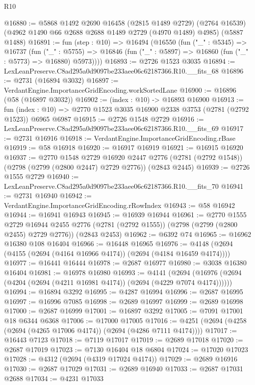 \begin{lexlean}{R10}
\begin{coremodule}
@16880 := @5868
    @1492
    @2690
    @16458
    (@2815 @1489 @2729)
    (@2764 @16539)
    (@4962 @1490 @66 @2688 @2688 @1489 @2729 (@4970 @1489) @4985)
    (@5887 @1488)
@16891 := fun (step : @10) =>
  @16494
    (@16550
      (fun ("_" : @5345) =>
      @16737
        (fun ("_" : @5755) =>
        @16846 (fun ("_" : @5897) => @16860 (fun ("_" : @5773) => @16880) @5973))))
@16893 := @2726 @1523 @3035
@16894 := LexLeanPreserve.C8ad295a0d9097be233aee06c62187366.R10.__fits_68
@16896 := @2731 (@16894 @3032)
@16897 := VerdantEngine.ImportanceGridEncoding.workSortedLane
@16900 := @16896 (@58 (@16897 @3032))
@16902 := (index : @10) -> @16893 @16900
@16913 := fun (index : @10) =>
  @2770 @1523 @3035 @16900 @2338 @3753 (@2781 (@2792 @1523)) @6965 @6987
@16915 := @2726 @1548 @2729
@16916 := LexLeanPreserve.C8ad295a0d9097be233aee06c62187366.R10.__fits_69
@16917 := @2731 @16916
@16918 := VerdantEngine.ImportanceGridEncoding.rBase
@16919 := @58 @16918
@16920 := @16917 @16919
@16921 := @16915 @16920
@16937 := @2770
    @1548
    @2729
    @16920
    @2447
    @2776
    (@2781 (@2792 @1548))
    (@2798 (@2799 (@2800 @2447) @2729 @2776))
    (@2843 @2445)
@16939 := @2726 @1555 @2729
@16940 := LexLeanPreserve.C8ad295a0d9097be233aee06c62187366.R10.__fits_70
@16941 := @2731 @16940
@16942 := VerdantEngine.ImportanceGridEncoding.rRowIndex
@16943 := @58 @16942
@16944 := @16941 @16943
@16945 := @16939 @16944
@16961 := @2770
    @1555
    @2729
    @16944
    @2455
    @2776
    (@2781 (@2792 @1555))
    (@2798 (@2799 (@2800 @2455) @2729 @2776))
    (@2843 @2453)
@16962 := @6392 @74
@16965 := @16962 @16380 @108 @16404
@16966 := @16448 @16965
@16976 := @4148 (@2694 (@4155 (@2694 (@4164 @16966 @4174)) (@2694 (@4184 @16459 @4174))))
@16977 := @16441 @16444
@16978 := @2687 @16977
@16980 := @3038 @16380 @16404
@16981 := @16978 @16980
@16993 := @4141
    (@2694 (@16976 (@2694 (@4204 (@2694 (@4211 @16981 @4174)) (@2694 (@4229 @7074 @4174))))))
@16994 := @16894 @3292
@16995 := @4287 @16994
@16996 := @2687 @16995
@16997 := @16996 @7085
@16998 := @2689 @16997
@16999 := @2689 @16998
@17000 := @2687 @16999
@17001 := @16897 @3292
@17005 := @7091 @17001 @18 @6344 @6368
@17006 := @17000 @17005
@17016 := @4251 (@2694 (@4258 (@2694 (@4265 @17006 @4174)) (@2694 (@4286 @7111 @4174))))
@17017 := @16443 @7123
@17018 := @7119 @17017
@17019 := @2689 @17018
@17020 := @2687 @17019
@17023 := @7130 @16404 @18 @6804
@17024 := @17020 @17023
@17028 := @4312 (@2694 (@4319 @17024 @4174))
@17029 := @2689 @16916
@17030 := @2687 @17029
@17031 := @2689 @16940
@17033 := @2687 @17031 @2688
@17034 := @4231 @17033

\end{coremodule}
\end{lexlean}
